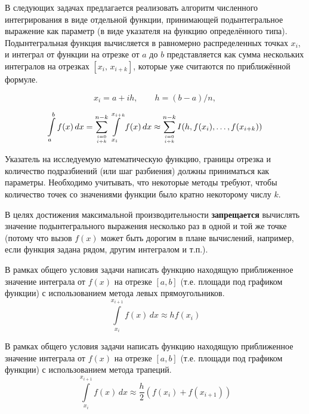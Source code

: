 
В следующих задачах предлагается реализовать алгоритм численного 
интегрирования в виде отдельной функции, принимающей подынтегральное выражение
как параметр (в виде указателя на функцию определённого типа). Подынтегральная 
функция вычисляется в равномерно распределенных точках $x_i$, и интеграл от 
функции на отрезке от $a$ до $b$ представляется как сумма нескольких интегралов 
на отрезках $[x_i,\, x_{i+k}]$, которые уже считаются по приближённой формуле.

\[ x_i = a + i h,\qquad h = (b-a)/n, \]

\[ 
\int\limits_a^b f(x)\,dx = 
\sum_{{i=0} \above 0pt {i\div k}}^{n-k} \int\limits_{x_i}^{x_{i+k}} f(x)\,dx \approx
\sum_{{i=0} \above 0pt {i\div k}}^{n-k} I(h, f(x_i),\dots, f(x_{i+k}))
\]

Указатель на исследуемую математическую функцию, границы отрезка и количество
подразбиений (или шаг разбиения) должны приниматься как параметры. Необходимо 
учитывать, что некоторые методы требуют, чтобы количество точек со значениями 
функции было кратно некоторому числу $k$.

В целях достижения максимальной производительности \textbf{запрещается} вычислять
значение подынтегрального выражения несколько раз в одной и той же точке (потому 
что вызов $f(x)$ может быть дорогим в плане вычислений, например, если функция 
задана рядом, другим интегралом и т.п.).


\begin{zztask}
В рамках общего условия задачи написать функцию находящую приближенное значение 
интеграла от $f(x)$ на отрезке $[a, b]$ (т.е. площади под графиком функции)
с использованием метода левых прямоугольников. 
\[
\int\limits_{x_i}^{x_{i+1}} f(x)\,dx \approx h f(x_i)
\]
\end{zztask}


\begin{zztask}
В рамках общего условия задачи написать функцию находящую приближенное значение 
интеграла от $f(x)$ на отрезке $[a, b]$ (т.е. площади под графиком функции)
с использованием метода трапеций. 
\[
\int\limits_{x_i}^{x_{i+1}} f(x)\,dx \approx \frac{h}{2} \left(f(x_i)+f(x_{i+1})\right)
\]
\end{zztask}

